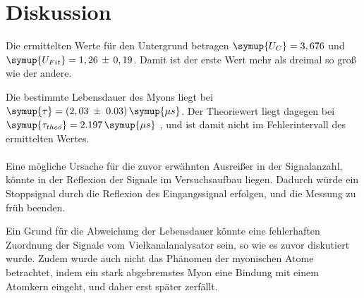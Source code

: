 \section{Diskussion}
\label{sec:Diskussion}

Die ermittelten Werte für den Untergrund betragen $\symup{U_{C}} = 3,676$ und
$\symup{U_{Fit}} = 1,26\,\pm\,0,19$. Damit ist der erste Wert mehr als dreimal so
groß wie der andere.

Die bestimmte Lebensdauer des Myons liegt bei $\symup{\tau} = (2,03\;\pm\;0.03)\,\symup{\mu s}$.
Der Theoriewert liegt dagegen bei $\symup{\tau_{theo}} = 2.197\,\symup{\mu s}$ \cite{PhysRevD.98.030001}, und ist
damit nicht im Fehlerintervall des ermittelten Wertes.\\
\ \\
\noindent
Eine mögliche Ursache für die zuvor erwähnten Ausreißer in der Signalanzahl, könnte in
der Reflexion der Signale im Versuchsaufbau liegen. Dadurch würde ein Stoppsignal durch
die Reflexion des Eingangssignal erfolgen, und die Messung zu früh beenden.

Ein Grund für die Abweichung der Lebensdauer könnte eine fehlerhaften Zuordnung der Signale
vom Vielkanalanalysator sein, so wie es zuvor diskutiert wurde. Zudem wurde auch nicht das Phänomen der myonischen Atome betrachtet,
indem ein stark abgebremstes Myon eine Bindung mit einem Atomkern eingeht, und daher erst später
zerfällt.
